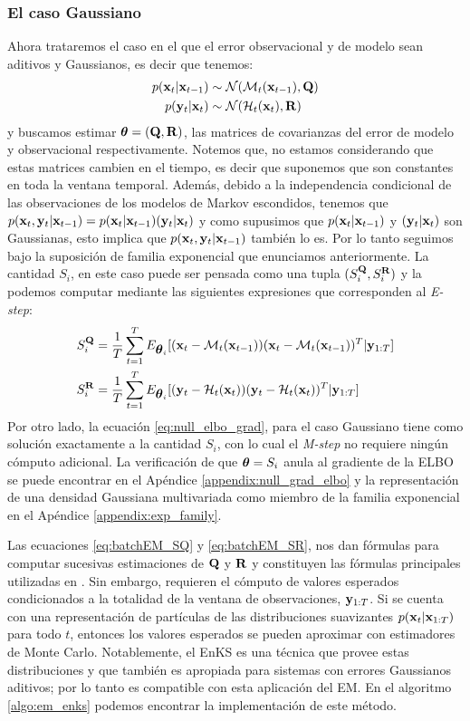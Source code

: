 \subsubsection*{El caso Gaussiano}
Ahora trataremos el caso en el que el error observacional y de modelo sean aditivos y Gaussianos, es decir que tenemos:
\begin{align}
    p(\mathbf{x}_t | \mathbf{x}_{t-1}) &\sim \mathcal{N}(\mathcal{M}_t(\mathbf{x}_{t-1}), \mathbf{Q}) \\
    p(\mathbf{y}_t | \mathbf{x}_t) &\sim \mathcal{N}(\mathcal{H}_t(\mathbf{x}_t), \mathbf{R})
\end{align}
y buscamos estimar $\mbox{\boldmath$ \theta $} = (\mathbf{Q}, \mathbf{R})$, las matrices de covarianzas del error de modelo y observacional respectivamente. Notemos que, no estamos considerando que estas matrices cambien en el tiempo, es decir que suponemos que son constantes en toda la ventana temporal. Además, debido a la independencia condicional de las observaciones de los modelos de Markov escondidos, tenemos que $p(\mathbf{x}_t, \mathbf{y}_t | \mathbf{x}_{t-1}) = p(\mathbf{x}_t | \mathbf{x}_{t-1}) (\mathbf{y}_t | \mathbf{x}_t)$ y como supusimos que $p(\mathbf{x}_t | \mathbf{x}_{t-1})$ y $(\mathbf{y}_t | \mathbf{x}_t)$ son Gaussianas, esto implica que $p(\mathbf{x}_t, \mathbf{y}_t | \mathbf{x}_{t-1})$ también lo es. Por lo tanto seguimos bajo la suposición de familia exponencial que enunciamos anteriormente. La cantidad $S_i$, en este caso puede ser pensada como una tupla $(S_i^{\mathbf{Q}}, S_i^{\mathbf{R}})$ y la podemos computar mediante las siguientes expresiones que corresponden al \textit{E-step}:
\begin{align}
    S_i^{\mathbf{Q}} &= \frac{1}{T}\sum_{t=1}^T E_{\mbox{\boldmath$ \theta $}_i}[(\mathbf{x}_t - \mathcal{M}_t(\mathbf{x}_{t-1}))(\mathbf{x}_t - \mathcal{M}_t(\mathbf{x}_{t-1}))^T | \mathbf{y}_{1:T}] \label{eq:batchEM_SQ} \\
    S_i^{\mathbf{R}} &= \frac{1}{T}\sum_{t=1}^T E_{\mbox{\boldmath$ \theta $}_i}[(\mathbf{y}_t - \mathcal{H}_t(\mathbf{x}_t))(\mathbf{y}_t - \mathcal{H}_t(\mathbf{x}_t))^T | \mathbf{y}_{1:T}] \label{eq:batchEM_SR}
\end{align}
Por otro lado, la ecuación \ref{eq:null_elbo_grad}, para el caso Gaussiano tiene como solución exactamente a la cantidad $S_i$, con lo cual el \textit{M-step} no requiere ningún cómputo adicional. La verificación de que $\mbox{\boldmath$ \theta $} = S_i$ anula al gradiente de la ELBO se puede encontrar en el Apéndice \ref{appendix:null_grad_elbo} y la representación de una densidad Gaussiana multivariada como miembro de la familia exponencial en el Apéndice \ref{appendix:exp_family}.

Las ecuaciones \ref{eq:batchEM_SQ} y \ref{eq:batchEM_SR}, nos dan fórmulas para computar sucesivas estimaciones de $\mathbf{Q}$ y $\mathbf{R}$ y constituyen las fórmulas principales utilizadas en \cite{Tandeo2015, Dreano2017, Pulido2018}. Sin embargo, requieren el cómputo de valores esperados condicionados a la totalidad de la ventana de observaciones, $\mathbf{y}_{1:T}$. Si se cuenta con una representación de partículas de las distribuciones suavizantes $p(\mathbf{x}_t | \mathbf{x}_{1:T})$ para todo $t$, entonces los valores esperados se pueden aproximar con estimadores de Monte Carlo. Notablemente, el EnKS es una técnica que provee estas distribuciones y que también es apropiada para sistemas con errores Gaussianos aditivos; por lo tanto es compatible con esta aplicación del EM. En el algoritmo \ref{algo:em_enks} podemos encontrar la implementación de este método.

